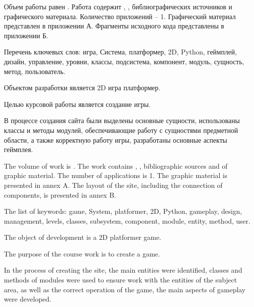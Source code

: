 
Объем работы равен . Работа содержит , ,  библиографических источников и  графического материала. Количество приложений – 1. Графический материал представлен в приложении А. Фрагменты исходного кода представлены в приложении Б.

Перечень ключевых слов: игра, Система, платформер, 2D, Python, геймплей, дизайн, управление, уровни, классы, подсистема, компонент, модуль, сущность, метод, пользователь.

Объектом разработки является 2D игра платформер.

Целью курсовой работы является создание игры.

В процессе создания сайта были выделены основные сущности, использованы классы и методы модулей, обеспечивающие работу с сущностями предметной области, а также корректную работу игры, разработаны основные аспекты геймплея.


  
The volume of work is . The work contains , ,  bibliographic sources and  of graphic material. The number of applications is 1. The graphic material is presented in annex A. The layout of the site, including the connection of components, is presented in annex B.

The list of keywords: game, System, platformer, 2D, Python, gameplay, design, management, levels, classes, subsystem, component, module, entity, method, user.

The object of development is a 2D platformer game.

The purpose of the course work is to create a game.

In the process of creating the site, the main entities were identified, classes and methods of modules were used to ensure work with the entities of the subject area, as well as the correct operation of the game, the main aspects of gameplay were developed.
